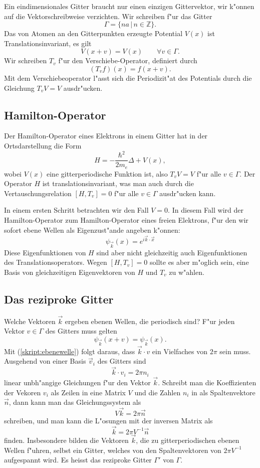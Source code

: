 Ein eindimensionales Gitter braucht nur einen einzigen Gittervektor,
wir k"onnen auf die Vektorschreibweise verzichten.
Wir schreiben f"ur das Gitter
\[
\Gamma=\{ na\,|\,n\in\mathbb Z\}.
\]
Das von Atomen an den Gitterpunkten erzeugte Potential $V(x)$
ist Translationsinvariant, es gilt
\[
V(x+v)=V(x)\qquad\forall v\in\Gamma.
\]
Wir schreiben $T_v$ f"ur den Verschiebe-Operator, definiert durch
\[
(T_vf)(x)=f(x+v).
\]
Mit dem Verschiebeoperator l"asst sich die Periodizit"at des Potentials
durch die Gleichung $T_vV=V$ ausdr"ucken.

\subsection{Hamilton-Operator}
Der Hamilton-Operator eines Elektrons in einem Gitter hat in der Ortsdarstellung
die Form
\[
H=-\frac{\hbar^2}{2m_e}\Delta + V(x),
\]
wobei $V(x)$ eine gitterperiodische Funktion ist, also $T_vV=V$ f"ur alle
$v\in\Gamma$.
Der Operator $H$ ist translationsinvariant, was man auch durch
die Vertauschungsrelation $[H,T_v]=0$ f"ur alle $v\in\Gamma$
ausdr"ucken kann.

In einem ersten Schritt betrachten wir den Fall $V=0$.
In diesem Fall wird der Hamilton-Operator zum Hamilton-Operator eines
freien Elektrons, f"ur den wir sofort ebene Wellen als Eigenzust"ande
angeben k"onnen:
\begin{equation}
\psi_{\vec k}(x)=e^{i\vec k\cdot \vec x}
\label{skript:ebenewelle}
\end{equation}
Diese Eigenfunktionen von $H$ sind aber nicht gleichzeitig auch
Eigenfunktionen des Translationsoperators. Wegen $[H,T_v]=0$
sollte es aber m"oglich sein, eine Basis von gleichzeitigen
Eigenvektoren von $H$ und $T_v$ zu w"ahlen.

\subsection{Das reziproke Gitter}
Welche Vektoren $\vec k$ ergeben ebenen Wellen, die periodisch sind?
F"ur jeden Vektor $v\in\Gamma$ des Gitters muss gelten
\[
\psi_{\vec k}(x+v)=\psi_{\vec k}(x).
\]
Mit (\ref{skript:ebenewelle}) folgt daraus, dass
$\vec k\cdot v$ ein Vielfaches von $2\pi$ sein muss.
Ausgehend von einer Basis $\vec v_i$ des Gitters sind
\[
\vec k\cdot v_i=2\pi n_i
\]
linear unbh"angige Gleichungen f"ur den Vektor $\vec k$. Schreibt man
die Koeffizienten der Vekoren $v_i$ als Zeilen in eine Matrix $V$
und die Zahlen $n_i$ in als Spaltenvektore $\vec n$,
dann kann man das Gleichungssystem als
\[
V\vec k=2\pi\vec n
\]
schreiben, und man kann die L"osungen mit der inversen Matrix als
\[
\vec k = 2\pi V^{-1}\vec n
\]
finden.
Insbesondere bilden die Vektoren $\vec k$, die zu gitterperiodischen
ebenen Wellen f"uhren, selbst ein Gitter, welches von den Spaltenvektoren
von $2\pi V^{-1}$ aufgespannt wird.
Es heisst das reziproke Gitter $\Gamma'$ von $\Gamma$.

